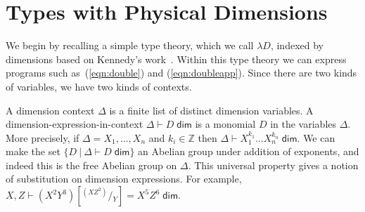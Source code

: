 \documentclass[a4paper,UKenglish]{lipics}
\theoremstyle{plain}
\newcommand{\msf}[1]{\mathsf{#1}} %
\newcommand{\Dj}[2]{#1 \vdash #2 \; \msf{ dim}}
\newcommand{\Dim}{D}
\newcommand{\Dvar}{X}
\begin{document}
\section{Types with Physical Dimensions}
\label{sec:Not}
We begin by recalling a simple type theory, which we call $\lambda D$, indexed by dimensions based on Kennedy's work~\cite{Kennedy:1997:RPU:263699.263761}. Within this type theory we can express programs such as~(\ref{eqn:double}) and (\ref{eqn:doubleapp}). Since there are two kinds of variables, we have two kinds of contexts.

\vspace{3mm} 
A dimension context $\Delta$ is a finite list of distinct
dimension variables.
A dimension-expression-in-context $\Dj\Delta \Dim$ is a monomial
$\Dim$ in the variables $\Delta$.
More precisely,
if $\Delta=\Dvar_1,\ldots, \Dvar_n$ and $k_i\in\mathbb Z$
then $\Dj \Delta{\Dvar_1^{k_1}\dots \Dvar_n^{k_n}}$.
We can make the set $\{\Dim~|~\Dj \Delta \Dim\}$ an Abelian group under addition of
exponents, and indeed this is the free Abelian group on $\Delta$.
This universal property gives a notion of substitution on dimension expressions.
For example,
$\Dj{X,Z}{(X^2Y^3)[^{(XZ^2)}\!/\!_Y]=X^5Z^6}$.
\end{document}

